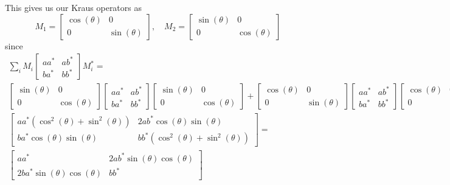 \documentclass[12pt]{article}%
\begin{document}
This gives us our Kraus operators as $$M_1 =   \left[\begin{matrix}
    \cos(\theta) & 0 \\
    0 & \sin(\theta)
  \end{matrix} \right], \quad M_2 = \left[\begin{matrix}
      \sin(\theta) & 0 \\
      0 & \cos(\theta)
    \end{matrix} \right] $$
  since
  \begin{gather*}
    \sum_i M_i
    \left[
    \begin{matrix}
      aa^* & ab^* \\
      ba^* & bb^*
    \end{matrix}
    \right] M_i^* = \\
    \left[\begin{matrix}
        \sin(\theta) & 0 \\
        0 & \cos(\theta)
      \end{matrix} \right]
    \left[
        \begin{matrix}
          aa^* & ab^* \\
          ba^* & bb^*
        \end{matrix}
        \right]
        \left[\begin{matrix}
            \sin(\theta) & 0 \\
            0 & \cos(\theta)
          \end{matrix} \right] +
          \left[\begin{matrix}
              \cos(\theta) & 0 \\
              0 & \sin(\theta)
            \end{matrix} \right]
          \left[
              \begin{matrix}
                aa^* & ab^* \\
                ba^* & bb^*
              \end{matrix}
              \right]
              \left[\begin{matrix}
                  \cos(\theta) & 0 \\
                  0 & \sin(\theta)
                \end{matrix} \right] = \\
                \left[
                    \begin{matrix}
                      aa^*(\cos^2(\theta)+\sin^2(\theta)) & 2ab^*\cos(\theta)\sin(\theta) \\
                      ba^*\cos(\theta)\sin(\theta) & bb^*(\cos^2(\theta)+\sin^2(\theta))
                    \end{matrix}
                    \right] = \\ \left[\begin{matrix}
                        aa^* & 2ab^*\sin(\theta)\cos(\theta) \\
                        2ba^*\sin(\theta)\cos(\theta) & bb^*
                      \end{matrix}\right]
  \end{gather*}
\end{document}
